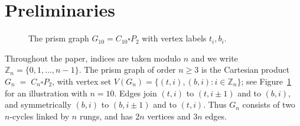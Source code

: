 \documentclass[11pt]{article}
\theoremstyle{plain}
\theoremstyle{definition}
\theoremstyle{remark}
\newcommand{\R}{\mathbb{R}}
\newcommand{\ZZ}{\mathbb{Z}}
\begin{document}
\section{Preliminaries}\label{sec:prelim}
\begin{figure}[t]
\centering
{}
\caption{The prism graph $G_{10}=C_{10}\square P_{2}$ with vertex labels $t_i,b_i$.}
\label{fig:prism}
\end{figure}

Throughout the paper, indices are taken modulo $n$ and we write $\ZZ_n=\{0,1,\dots,n-1\}$.
The prism graph of order $n\ge 3$ is the Cartesian product
$G_n \;=\; C_n \square P_2$,
with vertex set $V(G_n)=\{(t,i),(b,i): i\in\ZZ_n\}$; see Figure~\ref{fig:prism} for an illustration with $n=10$. Edges join $(t,i)$ to $(t,i\pm1)$ and to $(b,i)$, and symmetrically $(b,i)$ to $(b,i\pm1)$
and to $(t,i)$.  Thus $G_n$ consists of two $n$-cycles linked by $n$ rungs, and has $2n$
vertices and $3n$ edges.
\end{document}
